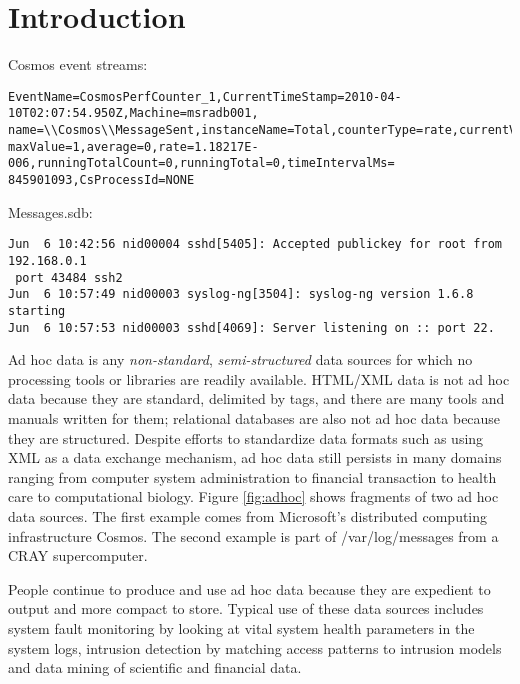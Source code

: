 \section{Introduction}

\begin{figure*}
Cosmos event streams:
{\small
\begin{verbatim}
EventName=CosmosPerfCounter_1,CurrentTimeStamp=2010-04-10T02:07:54.950Z,Machine=msradb001,
name=\\Cosmos\\MessageSent,instanceName=Total,counterType=rate,currentValue=1,minValue=1,
maxValue=1,average=0,rate=1.18217E-006,runningTotalCount=0,runningTotal=0,timeIntervalMs=
845901093,CsProcessId=NONE
\end{verbatim}
}
Messages.sdb:
{\small
\begin{verbatim}
Jun  6 10:42:56 nid00004 sshd[5405]: Accepted publickey for root from 192.168.0.1 
 port 43484 ssh2
Jun  6 10:57:49 nid00003 syslog-ng[3504]: syslog-ng version 1.6.8 starting
Jun  6 10:57:53 nid00003 sshd[4069]: Server listening on :: port 22.
\end{verbatim}
}
\caption{Example ad hoc data sources}\label{fig:adhoc}
\end{figure*}


Ad hoc data is any {\em non-standard}, {\em semi-structured} 
data sources for which no processing tools or libraries are 
readily available. HTML/XML data is not ad hoc data because 
they are standard, delimited by tags, and there
are many tools and manuals written for them; relational databases 
are also not ad hoc data because they are structured. 
Despite efforts to standardize data formats such as using XML 
as a data exchange mechanism, ad hoc data still persists
in many domains ranging from computer system administration to 
financial transaction to health care to computational biology. Figure 
\ref{fig:adhoc} shows fragments of two ad hoc data sources.
The first example comes from Microsoft's distributed computing
infrastructure Cosmos. The second example is part of /var/log/messages
from a CRAY supercomputer.

People continue to produce and use ad hoc data because they 
are expedient to output and more compact to store.  
Typical use of these data sources includes system fault monitoring
by looking at vital system health parameters in the system logs,
intrusion detection by matching access patterns to intrusion
models and data mining of scientific and financial data.

